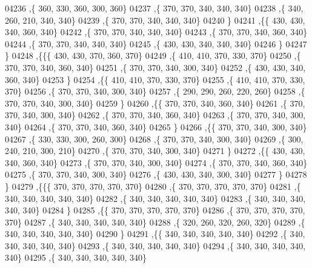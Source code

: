 \begin{DoxyCode}
04236     ,\{   360,   330,   360,   300,   360\}
04237     ,\{   370,   370,   340,   340,   340\}
04238     ,\{   340,   260,   210,   340,   340\}
04239     ,\{   370,   370,   340,   340,   340\}
04240     \}
04241    ,\{\{   430,   430,   340,   360,   340\}
04242     ,\{   370,   370,   340,   340,   340\}
04243     ,\{   370,   370,   340,   360,   340\}
04244     ,\{   370,   370,   340,   340,   340\}
04245     ,\{   430,   430,   340,   340,   340\}
04246     \}
04247    \}
04248   ,\{\{\{   430,   430,   370,   360,   370\}
04249     ,\{   410,   410,   370,   330,   370\}
04250     ,\{   370,   370,   340,   360,   340\}
04251     ,\{   370,   370,   340,   300,   340\}
04252     ,\{   430,   430,   340,   360,   340\}
04253     \}
04254    ,\{\{   410,   410,   370,   330,   370\}
04255     ,\{   410,   410,   370,   330,   370\}
04256     ,\{   370,   370,   340,   300,   340\}
04257     ,\{   290,   290,   260,   220,   260\}
04258     ,\{   370,   370,   340,   300,   340\}
04259     \}
04260    ,\{\{   370,   370,   340,   360,   340\}
04261     ,\{   370,   370,   340,   300,   340\}
04262     ,\{   370,   370,   340,   360,   340\}
04263     ,\{   370,   370,   340,   300,   340\}
04264     ,\{   370,   370,   340,   360,   340\}
04265     \}
04266    ,\{\{   370,   370,   340,   300,   340\}
04267     ,\{   330,   330,   300,   260,   300\}
04268     ,\{   370,   370,   340,   300,   340\}
04269     ,\{   300,   240,   210,   300,   210\}
04270     ,\{   370,   370,   340,   300,   340\}
04271     \}
04272    ,\{\{   430,   430,   340,   360,   340\}
04273     ,\{   370,   370,   340,   300,   340\}
04274     ,\{   370,   370,   340,   360,   340\}
04275     ,\{   370,   370,   340,   300,   340\}
04276     ,\{   430,   430,   340,   300,   340\}
04277     \}
04278    \}
04279   ,\{\{\{   370,   370,   370,   370,   370\}
04280     ,\{   370,   370,   370,   370,   370\}
04281     ,\{   340,   340,   340,   340,   340\}
04282     ,\{   340,   340,   340,   340,   340\}
04283     ,\{   340,   340,   340,   340,   340\}
04284     \}
04285    ,\{\{   370,   370,   370,   370,   370\}
04286     ,\{   370,   370,   370,   370,   370\}
04287     ,\{   340,   340,   340,   340,   340\}
04288     ,\{   320,   260,   320,   260,   320\}
04289     ,\{   340,   340,   340,   340,   340\}
04290     \}
04291    ,\{\{   340,   340,   340,   340,   340\}
04292     ,\{   340,   340,   340,   340,   340\}
04293     ,\{   340,   340,   340,   340,   340\}
04294     ,\{   340,   340,   340,   340,   340\}
04295     ,\{   340,   340,   340,   340,   340\}

\end{DoxyCode}
